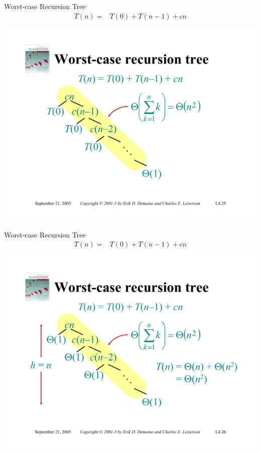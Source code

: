 \documentclass{beamer}
\begin{document}
\begin{frame}{Worst-case Recursion Tree}
    \begin{equation*}
        \begin{split}
            T(n) =& T(0) + T(n - 1) + cn \\
        \end{split}
    \end{equation*}
    \centering
    \includegraphics[width=\textwidth, trim={1.00cm 1.80cm 0.50cm 5.25cm}, clip]{pages/lec4_25}
\end{frame}
\begin{frame}{Worst-case Recursion Tree}
    \begin{equation*}
        \begin{split}
            T(n) =& T(0) + T(n - 1) + cn \\
        \end{split}
    \end{equation*}
    \centering
    \includegraphics[width=\textwidth, trim={1.00cm 1.80cm 0.50cm 5.25cm}, clip]{pages/lec4_26}
\end{frame}
\end{document}
